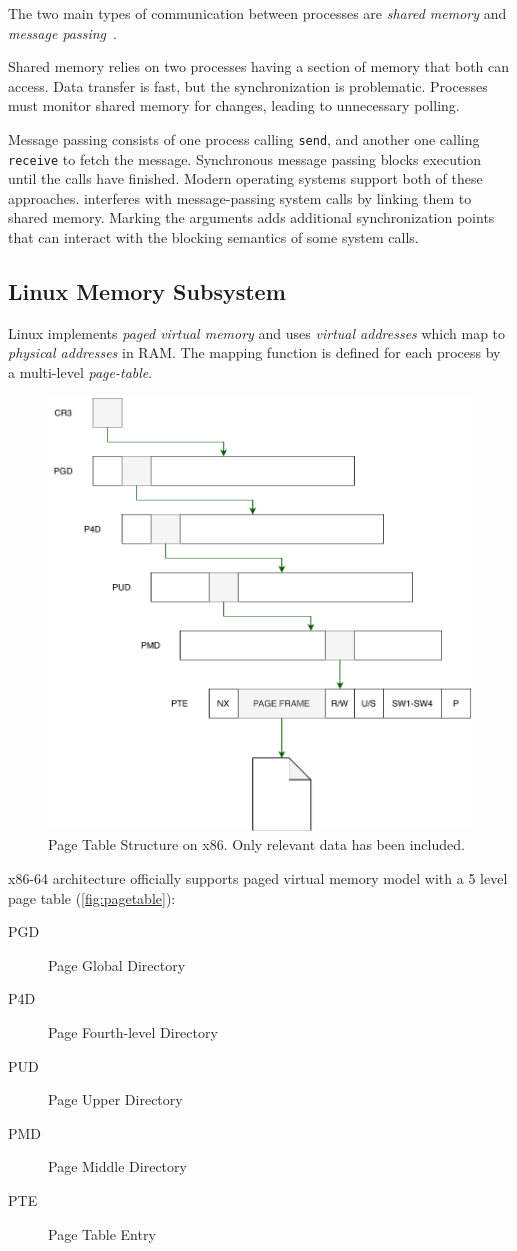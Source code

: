 The two main types of communication between processes are \emph{shared memory} 
and \emph{message passing}~\cite{silberschatz2018operating}.

Shared memory relies on two processes having a section of memory that both can 
access. Data transfer is fast, but the synchronization is problematic. 
Processes must monitor shared memory for changes, leading to unnecessary
polling.

Message passing consists of one process calling \texttt{send}, and another one
calling \texttt{receive} to fetch the message. Synchronous message passing
blocks execution until the calls have finished.
Modern operating systems support both of these approaches. \sysname interferes
with message-passing system calls by linking them to shared memory. Marking the
arguments adds additional synchronization points that can interact with the
blocking semantics of some system calls.

\subsection{Linux Memory Subsystem}
\label{subsec:vm}

Linux implements \emph{paged virtual memory} and uses \emph{virtual addresses}
which map to \emph{physical addresses} in RAM. The mapping function is defined
for each process by a multi-level \emph{page-table}.

\begin{figure}[]
  \centering
  \includegraphics[width = .35 \textwidth]{img/pagetable.pdf}
  \caption{Page Table Structure on x86. Only relevant data has been included.}
  \label{fig:pagetable}
\end{figure}
x86-64 architecture officially supports paged virtual memory model with a 5 
level page table (\autoref{fig:pagetable}):
\begin{description}
    \item[PGD] Page Global Directory
    \item[P4D] Page Fourth-level Directory
    \item[PUD] Page Upper Directory
    \item[PMD] Page Middle Directory
    \item[PTE] Page Table Entry
\end{description}

